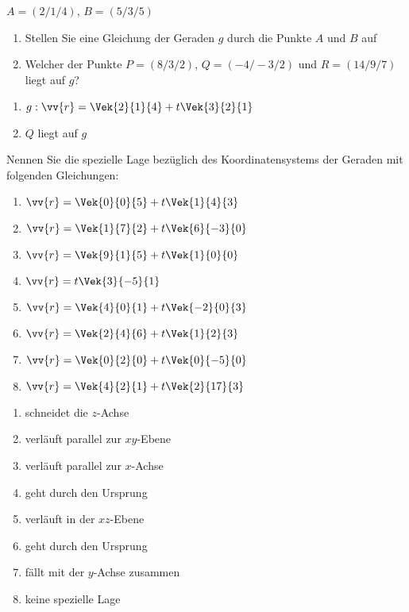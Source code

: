 

\begin{exercise}
$A=(2/1/4)$, $B=(5/3/5)$
\begin{enumerate}
\item Stellen Sie eine Gleichung der Geraden $g$ durch die Punkte $A$ und $B$ auf
\item Welcher der Punkte $P=(8/3/2)$, $Q=(-4/-3/2)$ und $R=(14/9/7)$ liegt auf $g$?
\end{enumerate}
\begin{answer}
\begin{enumerate}
\item $g: \vv{r} =\Vek{2}{1}{4} + t \Vek{3}{2}{1}$
\item $Q$ liegt auf $g$
\end{enumerate}
\end{answer}
\end{exercise}

\begin{exercise}
Nennen Sie die spezielle Lage bezüglich des Koordinatensystems der Geraden mit folgenden Gleichungen:

\begin{enumerate}
\item $\vv{r} = \Vek{0}{0}{5} + t \Vek{1}{4}{3}$
\item $\vv{r} = \Vek{1}{7}{2} + t \Vek{6}{-3}{0}$
\item $\vv{r} = \Vek{9}{1}{5} + t \Vek{1}{0}{0}$
\item $\vv{r} =  t \Vek{3}{-5}{1}$
\item $\vv{r} = \Vek{4}{0}{1} + t \Vek{-2}{0}{3}$
\item $\vv{r} = \Vek{2}{4}{6} + t \Vek{1}{2}{3}$
\item $\vv{r} = \Vek{0}{2}{0} + t \Vek{0}{-5}{0}$
\item $\vv{r} = \Vek{4}{2}{1} + t \Vek{2}{17}{3}$
\end{enumerate}

\begin{answer}
\begin{enumerate}
\item schneidet die $z$-Achse
\item verläuft parallel zur $xy$-Ebene
\item verläuft parallel zur $x$-Achse
\item geht durch den Ursprung
\item verläuft in der $xz$-Ebene
\item geht durch den Ursprung
\item fällt mit der $y$-Achse zusammen
\item keine spezielle Lage
\end{enumerate}
\end{answer}
\end{exercise}

